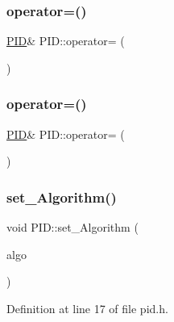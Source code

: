 \subsubsection{\texorpdfstring{operator=()}{operator=()}\hspace{0.1cm}{\footnotesize\ttfamily [1/2]}}
{\footnotesize\ttfamily \mbox{\hyperlink{class_p_i_d}{P\+ID}}\& P\+I\+D\+::operator= (\begin{DoxyParamCaption}\item[{\mbox{\hyperlink{class_p_i_d}{P\+ID}} \&\&}]{ }\end{DoxyParamCaption})\hspace{0.3cm}{\ttfamily [default]}}

\mbox{\label{class_p_i_d_ad2eaf8a497ab2c737fd167d6d6e28c91}} 
\subsubsection{\texorpdfstring{operator=()}{operator=()}\hspace{0.1cm}{\footnotesize\ttfamily [2/2]}}
{\footnotesize\ttfamily \mbox{\hyperlink{class_p_i_d}{P\+ID}}\& P\+I\+D\+::operator= (\begin{DoxyParamCaption}\item[{const \mbox{\hyperlink{class_p_i_d}{P\+ID}} \&}]{ }\end{DoxyParamCaption})\hspace{0.3cm}{\ttfamily [default]}}

\mbox{\label{class_p_i_d_af9dc86555b8f221ca9d19f393e179196}} 
\subsubsection{\texorpdfstring{set\_Algorithm()}{set\_Algorithm()}}
{\footnotesize\ttfamily void P\+I\+D\+::set\+\_\+\+Algorithm (\begin{DoxyParamCaption}\item[{\mbox{\hyperlink{class_p_i_d___algorithm}{P\+I\+D\+\_\+\+Algorithm}} $\ast$}]{algo }\end{DoxyParamCaption})\hspace{0.3cm}{\ttfamily [inline]}}



Definition at line 17 of file pid.\+h.

